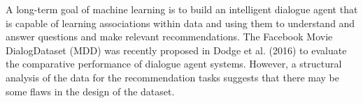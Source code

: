 A long-term goal of machine learning is to build an intelligent dialogue agent that is capable of learning associations within data and using them to understand and answer questions and make relevant recommendations. The Facebook Movie DialogDataset (MDD) was recently proposed in Dodge et al. (2016) to evaluate the comparative performance of dialogue agent systems. However, a structural analysis of the data for the recommendation tasks suggests that there may be some flaws in the design of the dataset.
